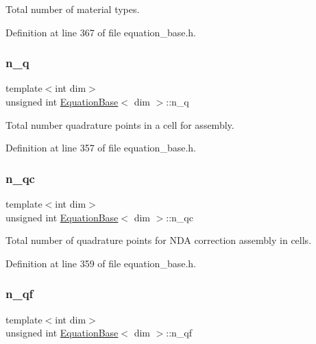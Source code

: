 Total number of material types. 



Definition at line 367 of file equation\+\_\+base.\+h.

\mbox{\label{class_equation_base_a8b8a299e37005a06a089ace9f473f94e}} 
\subsubsection{\texorpdfstring{n\+\_\+q}{n\_q}}
{\footnotesize\ttfamily template$<$int dim$>$ \\
unsigned int \hyperlink{class_equation_base}{Equation\+Base}$<$ dim $>$\+::n\+\_\+q\hspace{0.3cm}{\ttfamily [protected]}}



Total number quadrature points in a cell for assembly. 



Definition at line 357 of file equation\+\_\+base.\+h.

\mbox{\label{class_equation_base_a001c60e6c8df319b9f267688f84471da}} 
\subsubsection{\texorpdfstring{n\+\_\+qc}{n\_qc}}
{\footnotesize\ttfamily template$<$int dim$>$ \\
unsigned int \hyperlink{class_equation_base}{Equation\+Base}$<$ dim $>$\+::n\+\_\+qc\hspace{0.3cm}{\ttfamily [protected]}}



Total number of quadrature points for N\+DA correction assembly in cells. 



Definition at line 359 of file equation\+\_\+base.\+h.

\mbox{\label{class_equation_base_ad0bad2bd155657e65a923910e5b114aa}} 
\subsubsection{\texorpdfstring{n\+\_\+qf}{n\_qf}}
{\footnotesize\ttfamily template$<$int dim$>$ \\
unsigned int \hyperlink{class_equation_base}{Equation\+Base}$<$ dim $>$\+::n\+\_\+qf\hspace{0.3cm}{\ttfamily [protected]}}



